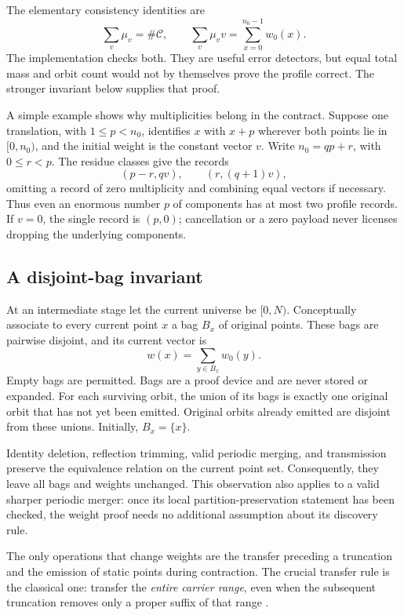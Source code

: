 The elementary consistency identities are
\begin{equation}
\label{eq:weighted-accounting}
 \sum_v\mu_v=\#\mathcal C,
 \qquad
 \sum_v\mu_v v=\sum_{x=0}^{n_0-1}w_0(x).
\end{equation}
The implementation checks both.  They are useful error detectors, but equal
total mass and orbit count would not by themselves prove the profile correct.
The stronger invariant below supplies that proof.

A simple example shows why multiplicities belong in the contract.  Suppose
one translation, with $1\leq p<n_0$, identifies $x$ with $x+p$ wherever both
points lie in
$[0,n_0)$, and the initial weight is the constant vector $v$.  Write
$n_0=qp+r$, with $0\leq r<p$.  The residue classes give the records
\[
 (p-r,qv),\qquad (r,(q+1)v),
\]
omitting a record of zero multiplicity and combining equal vectors if
necessary.  Thus even an enormous number $p$ of components has at most two
profile records.  If $v=0$, the single record is $(p,0)$; cancellation or a
zero payload never licenses dropping the underlying components.

\subsection{A disjoint-bag invariant}
\label{sec:weighted-invariant}

At an intermediate stage let the current universe be $[0,N)$.  Conceptually
associate to every current point $x$ a bag $B_x$ of original points.  These
bags are pairwise disjoint, and its current vector is
\[
 w(x)=\sum_{y\in B_x}w_0(y).
\]
Empty bags are permitted.  Bags are a proof device and are never stored or
expanded.  For each surviving orbit, the union of its bags is exactly one
original orbit that has not yet been emitted.  Original orbits already emitted
are disjoint from these unions.  Initially, $B_x=\{x\}$.

Identity deletion, reflection trimming, valid periodic merging, and
transmission preserve the equivalence relation on the current point set.
Consequently, they leave all bags and weights unchanged.  This observation
also applies to a valid sharper periodic merger: once its local
partition-preservation statement has been checked, the weight proof needs no
additional assumption about its discovery rule.

The only operations that change weights are the transfer preceding a
truncation and the emission of static points during contraction.  The crucial
transfer rule is the classical one: transfer the \emph{entire carrier range},
even when the subsequent truncation removes only a proper suffix of that
range \cite{AHT2006}.

